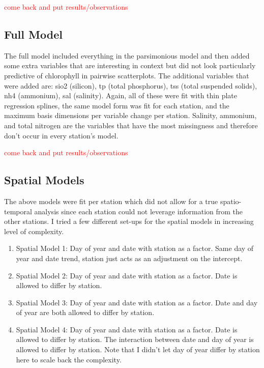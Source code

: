 \documentclass[12pt]{amsart}
\begin{document}
\textcolor{red}{come back and put results/observations}


\subsection{Full Model}

The full model included everything in the parsimonious model and then added some extra variables that are interesting in context but did not look particularly predictive of chlorophyll in pairwise scatterplots. The additional variables that were added are: sio2 (silicon), tp (total phosphorus), tss (total suspended solids), nh4 (ammonium), sal (salinity). Again, all of these were fit with thin plate regression splines, the same model form was fit for each station, and the maximum basis dimensions per variable change per station.  Salinity, ammonium, and total nitrogen are the variables that have the most missingness and therefore don't occur in every station's model.

\textcolor{red}{come back and put results/observations}



\subsection{Spatial Models}

The above models were fit per station which did not allow for a true spatio-temporal analysis since each station could not leverage information from the other stations. I tried a few different set-ups for the spatial models in increasing level of complexity.

\begin{enumerate}
\item Spatial Model 1: Day of year and date with station as a factor. Same day of year and date trend, station just acts as an adjustment on the intercept.
\item Spatial Model 2: Day of year and date with station as a factor. Date is allowed to differ by station.
\item Spatial Model 3: Day of year and date with station as a factor. Date and day of year are both allowed to differ by station.
\item Spatial Model 4:  Day of year and date with station as a factor. Date is allowed to differ by station. The interaction between date and day of year is allowed to differ by station. Note that I didn't let day of year differ by station here to scale back the complexity.
\end{enumerate}
\end{document}

